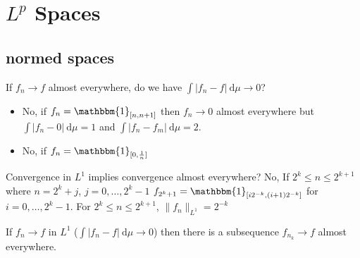 \chapter{$L^p$ Spaces}

\section{normed spaces}
\begin{remark}
  If $f_n \to f$ almost everywhere, do we have $\int |f_n -f| \ \mathrm{d}\mu \to 0$?
  \begin{itemize}
    \item No, if $f_n = \mathbbm{1}_{[n, n+1]}$ then $f_n \to 0$ almost everywhere but $\int |f_n - 0| \ \mathrm{d}\mu = 1$ and $\int |f_n - f_m|\ \mathrm{d}\mu = 2$.
    \item No, if $f_n = \mathbbm{1}_{[0, \frac1n]}$
  \end{itemize}
\end{remark}

\begin{remark}
  Convergence in $L^1$ implies convergence almost everywhere?
  No, If $2^k \le n \le 2^{k+1}$ where $n = 2^k +j$, $j = 0, \dotsc, 2^k-1$
  $f_{2^k+1} = \mathbbm{1}_{[i 2^{-k}, (i+1)2^{-k}]}$ for $i = 0, \dotsc, 2^k-1$.
  For $2^k \le n \le 2^{k+1}$, $\|f_n\|_{L^1} = 2^{-k}$
\end{remark}

\begin{claim}
  If $f_n \to f$ in $L^1$ ($\int |f_n - f| \ \mathrm{d}\mu \to 0$) 
  then there is a subsequence $f_{n_k} \to f$ almost everywhere.
\end{claim}

